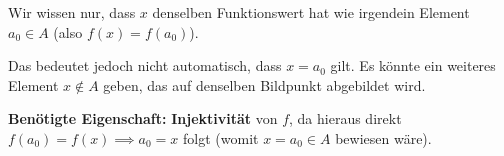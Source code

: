 \documentclass[11pt,a4paper]{article}
\begin{document}
\begin{stuckbox}
Wir wissen nur, dass $x$ denselben Funktionswert hat wie irgendein Element $a_0 \in A$ (also $f(x) = f(a_0)$).

Das bedeutet jedoch nicht automatisch, dass $x = a_0$ gilt. Es könnte ein weiteres Element $x \notin A$ geben, das auf denselben Bildpunkt abgebildet wird.

\medskip
\textbf{Benötigte Eigenschaft:} \textbf{Injektivität} von $f$, da hieraus direkt $f(a_0) = f(x) \implies a_0 = x$ folgt (womit $x = a_0 \in A$ bewiesen wäre).
\end{stuckbox}
\end{document}

